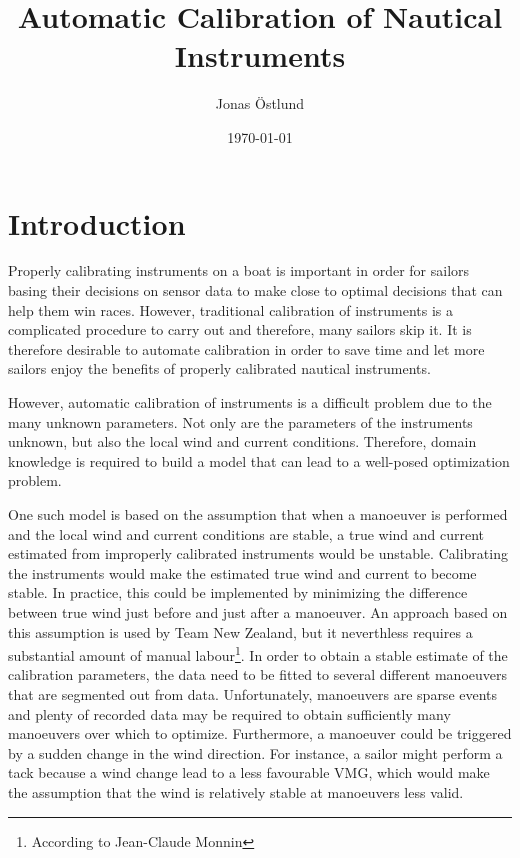 \documentclass{article}
\author{Jonas Östlund}
\date{\today}
\title{Automatic Calibration of Nautical Instruments}
\begin{document}
\maketitle
\section{Introduction}
Properly calibrating instruments on a boat is important in order for sailors basing their decisions on sensor data to make close to optimal decisions that can help them win races. However, traditional calibration of instruments is a complicated procedure to carry out and therefore, many sailors skip it. It is therefore desirable to automate calibration in order to save time and let more sailors enjoy the benefits of properly calibrated nautical instruments.

However, automatic calibration of instruments is a difficult problem due to the many unknown parameters. Not only are the parameters of the instruments unknown, but also the local wind and current conditions. Therefore, domain knowledge is required to build a model that can lead to a well-posed optimization problem.

One such model is based on the assumption that when a manoeuver is performed and the local wind and current conditions are stable, a true wind and current estimated from improperly calibrated instruments would be unstable. Calibrating the instruments would make the estimated true wind and current to become stable. In practice, this could be implemented by minimizing the difference between true wind just before and just after a manoeuver. An approach based on this assumption is used by Team New Zealand, but it neverthless requires a substantial amount of manual labour\footnote{According to Jean-Claude Monnin}. In order to obtain a stable estimate of the calibration parameters, the data need to be fitted to several different manoeuvers that are segmented out from data. Unfortunately, manoeuvers are sparse events and plenty of recorded data may be required to obtain sufficiently many manoeuvers over which to optimize. Furthermore, a manoeuver could be triggered by a sudden change in the wind direction. For instance, a sailor might perform a tack because a wind change lead to a less favourable VMG, which would make the assumption that the wind is relatively stable at manoeuvers less valid.
\end{document}
